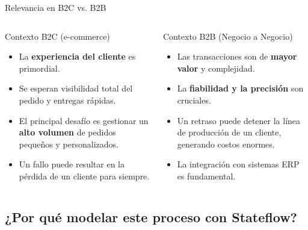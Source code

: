 \documentclass[aspectratio=169,xcolor=dvipsnames]{beamer}
\begin{document}
\begin{frame}{Relevancia en B2C vs. B2B}
    \begin{columns}[t]
            \begin{block}{Contexto B2C (e-commerce)}
                \begin{itemize}
                    \item La \textbf{experiencia del cliente} es primordial.
                    \item Se esperan visibilidad total del pedido y entregas rápidas.
                    \item El principal desafío es gestionar un \textbf{alto volumen} de pedidos pequeños y personalizados.
                    \item Un fallo puede resultar en la pérdida de un cliente para siempre.
                \end{itemize}
            \end{block}

            \begin{alertblock}{Contexto B2B (Negocio a Negocio)}
                 \begin{itemize}
                    \item Las transacciones son de \textbf{mayor valor} y complejidad.
                    \item La \textbf{fiabilidad y la precisión} son cruciales.
                    \item Un retraso puede detener la línea de producción de un cliente, generando costos enormes.
                    \item La integración con sistemas ERP es fundamental.
                \end{itemize}
            \end{alertblock}
    \end{columns}
\end{frame}

\subsection{¿Por qué modelar este proceso con Stateflow?}
\end{document}
